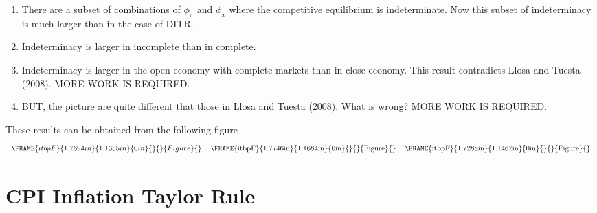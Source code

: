 \documentclass{article}
\begin{document}
\begin{enumerate}
\item There are a subset of combinations of $\phi _{\pi }$ and $\phi _{x}$
where the competitive equilibrium is indeterminate. Now this subset of
indeterminacy is much larger than in the case of DITR.

\item Indeterminacy is larger in incomplete than in complete.

\item Indeterminacy is larger in the open economy with complete markets than
in close economy. This result contradicts Llosa and Tuesta (2008). MORE WORK
IS REQUIRED.

\item BUT, the picture are quite different that those in Llosa and Tuesta
(2008). What is wrong? MORE WORK IS REQUIRED.
\end{enumerate}

These results can be obtained from the following figure%
\begin{equation*}
\begin{tabular}{lll}
$\FRAME{itbpF}{1.7694in}{1.1355in}{0in}{}{}{Figure}{\special{language
"Scientific Word";type "GRAPHIC";maintain-aspect-ratio TRUE;display
"USEDEF";valid_file "T";width 1.7694in;height 1.1355in;depth
0in;original-width 11.6144in;original-height 7.3855in;cropleft "0";croptop
"1";cropright "1";cropbottom "0";tempfilename
'L3823R07.wmf';tempfile-properties "XPR";}}$ & \FRAME{itbpF}{1.7746in}{%
1.1684in}{0in}{}{}{Figure}{\special{language "Scientific Word";type
"GRAPHIC";maintain-aspect-ratio TRUE;display "USEDEF";valid_file "T";width
1.7746in;height 1.1684in;depth 0in;original-width 11.6456in;original-height
7.6043in;cropleft "0";croptop "1";cropright "1";cropbottom "0";tempfilename
'L381S105.wmf';tempfile-properties "XPR";}} & \FRAME{itbpF}{1.7288in}{%
1.1467in}{0in}{}{}{Figure}{\special{language "Scientific Word";type
"GRAPHIC";maintain-aspect-ratio TRUE;display "USEDEF";valid_file "T";width
1.7288in;height 1.1467in;depth 0in;original-width 11.3438in;original-height
7.4581in;cropleft "0";croptop "1";cropright "1";cropbottom "0";tempfilename
'L381Z806.wmf';tempfile-properties "XPR";}}%
\end{tabular}%
\end{equation*}

\section{CPI Inflation Taylor Rule}
\end{document}
